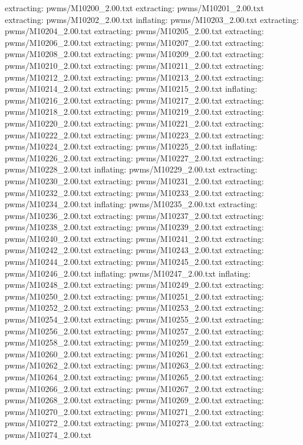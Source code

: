 \documentclass[letterpaper,10pt,english]{sphinxmanual}
\begin{document}
{\begin{sphinxVerbatim}[commandchars=\\\{\}]
 extracting: pwms/M10200\_2.00.txt
 extracting: pwms/M10201\_2.00.txt
 extracting: pwms/M10202\_2.00.txt
  inflating: pwms/M10203\_2.00.txt
 extracting: pwms/M10204\_2.00.txt
 extracting: pwms/M10205\_2.00.txt
 extracting: pwms/M10206\_2.00.txt
 extracting: pwms/M10207\_2.00.txt
 extracting: pwms/M10208\_2.00.txt
 extracting: pwms/M10209\_2.00.txt
 extracting: pwms/M10210\_2.00.txt
 extracting: pwms/M10211\_2.00.txt
 extracting: pwms/M10212\_2.00.txt
 extracting: pwms/M10213\_2.00.txt
 extracting: pwms/M10214\_2.00.txt
 extracting: pwms/M10215\_2.00.txt
  inflating: pwms/M10216\_2.00.txt
 extracting: pwms/M10217\_2.00.txt
 extracting: pwms/M10218\_2.00.txt
 extracting: pwms/M10219\_2.00.txt
 extracting: pwms/M10220\_2.00.txt
 extracting: pwms/M10221\_2.00.txt
 extracting: pwms/M10222\_2.00.txt
 extracting: pwms/M10223\_2.00.txt
 extracting: pwms/M10224\_2.00.txt
 extracting: pwms/M10225\_2.00.txt
  inflating: pwms/M10226\_2.00.txt
 extracting: pwms/M10227\_2.00.txt
 extracting: pwms/M10228\_2.00.txt
  inflating: pwms/M10229\_2.00.txt
 extracting: pwms/M10230\_2.00.txt
 extracting: pwms/M10231\_2.00.txt
 extracting: pwms/M10232\_2.00.txt
 extracting: pwms/M10233\_2.00.txt
 extracting: pwms/M10234\_2.00.txt
  inflating: pwms/M10235\_2.00.txt
 extracting: pwms/M10236\_2.00.txt
 extracting: pwms/M10237\_2.00.txt
 extracting: pwms/M10238\_2.00.txt
 extracting: pwms/M10239\_2.00.txt
 extracting: pwms/M10240\_2.00.txt
 extracting: pwms/M10241\_2.00.txt
 extracting: pwms/M10242\_2.00.txt
 extracting: pwms/M10243\_2.00.txt
 extracting: pwms/M10244\_2.00.txt
 extracting: pwms/M10245\_2.00.txt
 extracting: pwms/M10246\_2.00.txt
  inflating: pwms/M10247\_2.00.txt
  inflating: pwms/M10248\_2.00.txt
 extracting: pwms/M10249\_2.00.txt
 extracting: pwms/M10250\_2.00.txt
 extracting: pwms/M10251\_2.00.txt
 extracting: pwms/M10252\_2.00.txt
 extracting: pwms/M10253\_2.00.txt
 extracting: pwms/M10254\_2.00.txt
 extracting: pwms/M10255\_2.00.txt
 extracting: pwms/M10256\_2.00.txt
 extracting: pwms/M10257\_2.00.txt
 extracting: pwms/M10258\_2.00.txt
 extracting: pwms/M10259\_2.00.txt
 extracting: pwms/M10260\_2.00.txt
 extracting: pwms/M10261\_2.00.txt
 extracting: pwms/M10262\_2.00.txt
 extracting: pwms/M10263\_2.00.txt
 extracting: pwms/M10264\_2.00.txt
 extracting: pwms/M10265\_2.00.txt
 extracting: pwms/M10266\_2.00.txt
 extracting: pwms/M10267\_2.00.txt
 extracting: pwms/M10268\_2.00.txt
 extracting: pwms/M10269\_2.00.txt
 extracting: pwms/M10270\_2.00.txt
 extracting: pwms/M10271\_2.00.txt
 extracting: pwms/M10272\_2.00.txt
 extracting: pwms/M10273\_2.00.txt
 extracting: pwms/M10274\_2.00.txt

\end{sphinxVerbatim}}
\end{document}
